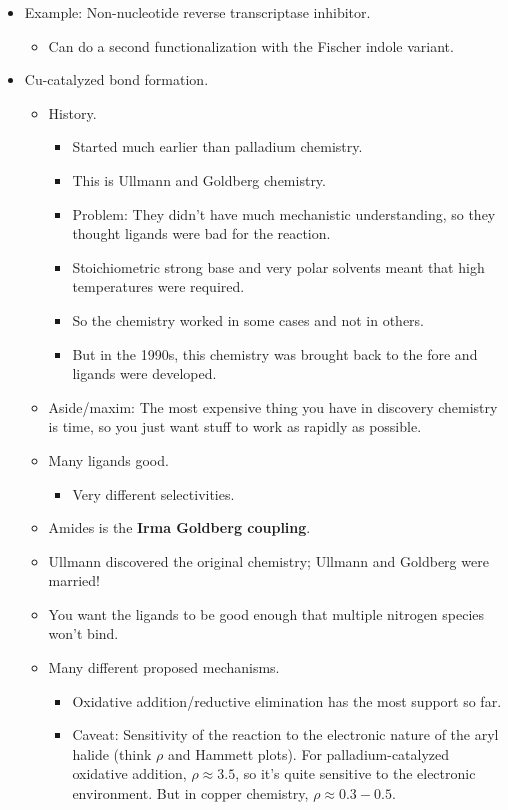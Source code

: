 \documentclass[../notes.tex]{subfiles}
\begin{document}
\begin{itemize}
    \item Example: Non-nucleotide reverse transcriptase inhibitor.
    \begin{itemize}
        \item Can do a second functionalization with the Fischer indole variant.
    \end{itemize}
    \item Cu-catalyzed  bond formation.
    \begin{itemize}
        \item History.
        \begin{itemize}
            \item Started much earlier than palladium chemistry.
            \item This is Ullmann and Goldberg chemistry.
            \item Problem: They didn't have much mechanistic understanding, so they thought ligands were bad for the reaction.
            \item Stoichiometric strong base and very polar solvents meant that high temperatures were required.
            \item So the chemistry worked in some cases and not in others.
            \item But in the 1990s, this chemistry was brought back to the fore and ligands were developed.
        \end{itemize}
        \item Aside/maxim: The most expensive thing you have in discovery chemistry is time, so you just want stuff to work as rapidly as possible.
        \item Many ligands good.
        \begin{itemize}
            \item Very different selectivities.
        \end{itemize}
        \item Amides is the \textbf{Irma Goldberg coupling}.
        \item Ullmann discovered the original chemistry; Ullmann and Goldberg were married!
        \item You want the ligands to be good enough that multiple nitrogen species won't bind.
        \item Many different proposed mechanisms.
        \begin{itemize}
            \item Oxidative addition/reductive elimination has the most support so far.
            \item Caveat: Sensitivity of the reaction to the electronic nature of the aryl halide (think $\rho$ and Hammett plots). For palladium-catalyzed oxidative addition, $\rho\approx 3.5$, so it's quite sensitive to the electronic environment. But in copper chemistry, $\rho\approx 0.3-0.5$.

\end{itemize}
\end{itemize}
\end{itemize}
\end{document}
